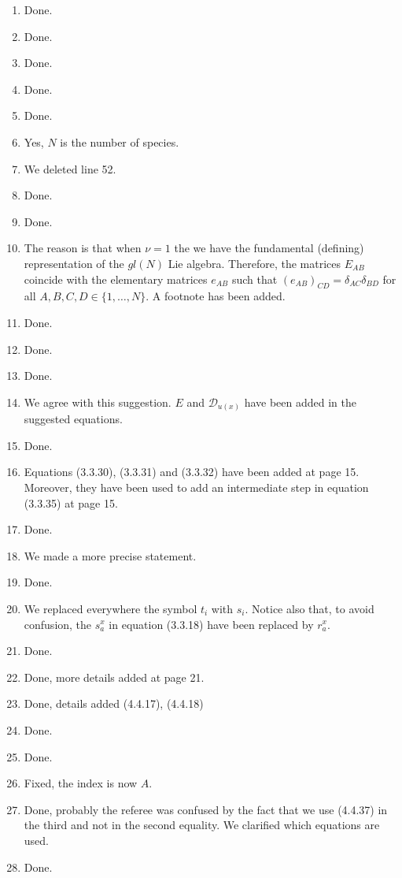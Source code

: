\documentclass[10pt]{article}
\numberwithin{equation}{section}
\numberwithin{equation}{subsection}
\begin{document}
		\begin{enumerate}
			\item Done.
			\item Done.
			\item Done.
			\item Done.
			\item Done.
			\item Yes, $N$ is the number of species. 
			\item We deleted line 52.
			\item Done.
			\item Done.
			\item The reason is that when $\nu=1$ the we have the fundamental (defining) representation of the $gl(N)$ Lie algebra. Therefore, the matrices $E_{AB}$ coincide with the elementary matrices $e_{AB}$ such that $(e_{AB})_{CD}=\delta_{AC}\delta_{BD}$ for all $A,B,C,D\in\{1,\ldots,N\}$. A footnote has been added.
			\item Done.
			\item Done.
			\item Done.
			\item We agree with this suggestion. $E$ and $\mathcal{D}_{u(x)}$ have been added in the suggested equations.
			\item Done.
			\item Equations (3.3.30), (3.3.31) and (3.3.32) have been added at page 15. Moreover, they have been used to add an intermediate step in equation (3.3.35) at page 15.
			\item Done.
			\item We made a more precise statement. 
			\item Done.
			\item We replaced everywhere the symbol $t_{i}$ with $s_{i}$. Notice also that, to avoid confusion, the $s_{a}^{x}$ in equation (3.3.18) have been replaced by $r_{a}^{x}$.
			\item Done. 
			\item Done, more details added at page 21. 
			\item Done, details added (4.4.17), (4.4.18)
			\item Done.
			\item Done.
			\item Fixed, the index is now $A$.
			\item Done, probably the referee was confused by the fact that we use (4.4.37) in the third and not in the second equality. We clarified which equations are used. 
			\item Done.

\end{enumerate}
\end{document}
